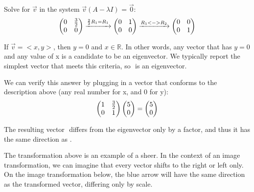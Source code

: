 \documentclass{article}
\begin{document}
 \par\noindent Solve for \( \vec v\) in the system \( \vec v (A - \lambda I)\) = \( \vec 0\):
 \[
  \left(\begin{array}{@{}cc@{}}
 	0 & \frac{3}{2} \\
 	0 & 0\\
 \end{array}\right) \xrightarrow[]{\frac{2}{3}R_1 = R_1} 
  \left(\begin{array}{@{}cc@{}}
 	0 & 1 \\
 	0 & 0\\
 \end{array}\right) \xrightarrow[]{R_1 <-> R_2}
  \left(\begin{array}{@{}cc@{}}
	0 & 0 \\
	0 & 1\\
\end{array}\right)
\]
\par \noindent If \( \vec v = <x,y> \), then \(y=0\) and \(x \in \mathbb{R}\). In other words, any vector that has \(y=0\) and any value of x is a candidate to be an eigenvector. We typically report the simplest vector that meets this criteria, so \(<1,0>\) is an eigenvector.
\newline
\par \noindent We can verify this answer by plugging in a vector that conforms to the description above (any real number for x, and 0 for y):
 \[ 
\left(\begin{array}{@{}cc@{}}
	1 & \frac{3}{2} \\
	0 & 1\\
\end{array}\right) 
\left(\begin{array}{@{}c@{}}
	5 \\
	0 \\
\end{array}\right) 
=   
\left(\begin{array}{@{}c@{}}
	5 \\
	0 \\
\end{array}\right) 
\]
\par \noindent The resulting vector \(<5,0>\) differs from the eigenvector only by a factor, and thus it has the same direction as \(<1,0>\).
\newline
\par \noindent The transformation above is an example of a sheer. In the context of an image transformation, we can imagine that every vector shifts to the right or left only. On the image transformation below, the blue arrow will have the same direction as the transformed vector, differing only by scale.
\end{document}
